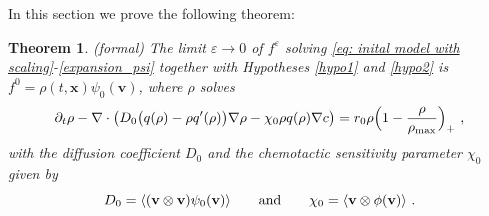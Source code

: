 \documentclass{article}
\newtheorem{theorem}{Theorem}
\begin{document}
In this section we prove the following theorem:
\begin{theorem}{}\label{theorem1}(formal)
The limit $\varepsilon \rightarrow 0$ of $f^\varepsilon$ solving \eqref{eq: inital model with scaling}-\eqref{expansion_psi} together with Hypotheses \ref{hypo1} and \ref{hypo2} is $f^0 = \rho(t,\mathbf{x})\psi_0(\mathbf{v})$, where $\rho$ solves
\begin{equation}
    \partial_t\rho-\nabla\cdot\left(D_0\big(q(\rho)-\rho q'(\rho) \big)\nabla \rho-\chi_0\rho q(\rho)\nabla c \right)={r_0\rho\Bigl(1-\frac{\rho}{\rho_{\textnormal{max}}} \Bigr)_+}\ ,\label{eq: macroscopic equation1}
\end{equation}
with the diffusion coefficient $D_0$ and the chemotactic sensitivity parameter $\chi_0$ given by
\begin{equation}D_0=\langle(\mathbf{v}\otimes \mathbf{v})\psi_0(\mathbf{v})\rangle\qquad \textnormal{and}\qquad \chi_0=\langle\mathbf{v}\otimes\phi(\mathbf{v})\rangle\ . \label{eq: macroscopic coefficients}
\end{equation}
\end{theorem}
\end{document}
